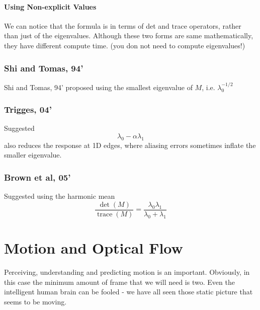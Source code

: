 \documentclass[11pt]{article}
\begin{document}
\paragraph{Using Non-explicit Values} We can notice that the formula is in terms of det and trace operators, rather than just of the eigenvalues. Although these two forms are same mathematically, they have different compute time. (you don not need to compute eigenvalues!)

\subsubsection{Shi and Tomas, 94'}
Shi and Tomas, 94' proposed using the smallest eigenvalue of $M$, i.e. $\lambda_0^{-1/2}$

\subsubsection{Trigges, 04'}
Suggested 
\begin{equation}
	\lambda_0 - \alpha \lambda_1
\end{equation}
also reduces the response at 1D edges, where aliasing errors sometimes inflate the smaller eigenvalue. 

\subsubsection{Brown et al, 05'}
Suggested using the harmonic mean
\begin{equation}
	\frac{\operatorname{det}(M)}{\operatorname{trace}(M)}=\frac{\lambda_{0} \lambda_{1}}{\lambda_{0}+\lambda_{1}}
\end{equation}

\section{Motion and Optical Flow}
Perceiving, understanding and predicting motion is an important. Obviously, in this case the minimum amount of frame that we will need is two. Even the intelligent human brain can be fooled - we have all seen those static picture that seems to be moving. 
\end{document}
